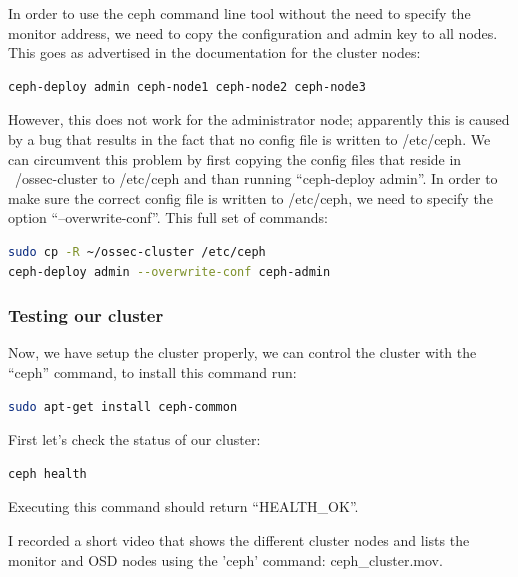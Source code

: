 \documentclass[12pt]{report}
\begin{document}
In order to use the ceph command line tool without the need to specify
the monitor address, we need to copy the configuration and admin key
to all nodes.
This goes as advertised in the documentation for the cluster nodes:
\begin{lstlisting}[language=bash]
ceph-deploy admin ceph-node1 ceph-node2 ceph-node3 
\end{lstlisting}
However, this does not work for the administrator node; apparently
this is caused by a bug \cite{ceph_bug_1} that results in the fact
that no config file is written to /etc/ceph.
We can circumvent this problem by first copying the config files that
reside in ~/ossec-cluster to /etc/ceph and than running ``ceph-deploy
admin''.
In order to make sure the correct config file is written to /etc/ceph,
we need to specify the option ``--overwrite-conf''.
This full set of commands:
\begin{lstlisting}[language=bash]
sudo cp -R ~/ossec-cluster /etc/ceph
ceph-deploy admin --overwrite-conf ceph-admin
\end{lstlisting}

\subsubsection{Testing our cluster}
Now, we have setup the cluster properly, we can control the cluster
with the ``ceph'' command, to install this command run: 
\begin{lstlisting}[language=bash]
sudo apt-get install ceph-common
\end{lstlisting}
First let's check the status of our cluster:
\begin{lstlisting}[language=bash]
ceph health
\end{lstlisting}
Executing this command should return ``HEALTH\_OK''.

I recorded a short video that shows the different cluster nodes and
lists the monitor and OSD nodes using the 'ceph' command: ceph\_cluster.mov.
\end{document}
